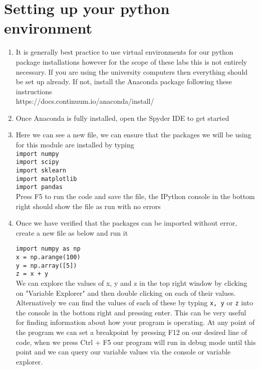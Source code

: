 \documentclass[12pt]{article}
\def\code#1{\texttt{#1}} %
\begin{document}
\section{Setting up your python environment}
\begin{enumerate}
\item It is generally best practice to use virtual environments for our python package installations however for the scope of these labs this is not entirely necessary. If you are using the university computers then everything should be set up already. If not, install the Anaconda package following these instructions \\https://docs.continuum.io/anaconda/install/ 
\item Once Anaconda is fully installed, open the Spyder IDE to get started
\item Here we can see a new file, we can ensure that the packages we will be using for this module are installed by typing \\
\code{import numpy \\ import scipy \\ import sklearn \\ import matplotlib \\ import pandas} \\
Press F5 to run the code and save the file, the IPython console in the bottom right should show the file as run with no errors 
\item Once we have verified that the packages can be imported without error, create a new file as below and run it

\code{import numpy as np \\ x = np.arange(100) \\ y = np.array([5]) \\ z = x + y } \\

We can explore the values of x, y and z in the top right window by clicking on "Variable Explorer" and then double clicking on each of their values. Alternatively we can find the values of each of these by typing \code{x, y} or \code{z} into the console in the bottom right and pressing enter. This can be very useful for finding information about how your program is operating. At any point of the program we can set a breakpoint by pressing F12 on our desired line of code, when we press Ctrl + F5 our program will run in debug mode until this point and we can query our variable values via the console or variable explorer.
\end{enumerate}
\end{document}
